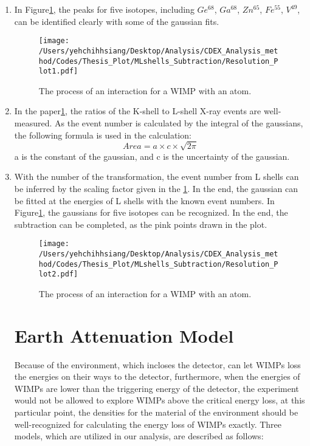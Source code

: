 \begin{enumerate}
	\item In Figure\ref{}, the peaks for five isotopes, including $Ge^{68}$, $Ga^{68}$, $Zn^{65}$, $Fe^{55}$, $V^{49}$, can be identified clearly with some of the gaussian fits. \\
	
        \begin{figure}[h]
        \texttt{[image: /Users/yehchihhsiang/Desktop/Analysis/CDEX\_Analysis\_method/Codes/Thesis\_Plot/MLshells\_Subtraction/Resolution\_Plot1.pdf]}
        \centering
        \caption{The process of an interaction for a WIMP with an atom.} \label{Interaction}
        \end{figure}
        
	\item In the paper\ref{}, the ratios of the K-shell to L-shell X-ray events are well-measured.  As the event number is calculated by the integral of the gaussians, the following formula is used in the calculation:\\
	\begin{equation}
        \label{Gaussian Area}
        Area  = a \times c \times \sqrt{2 \pi} 
        \end{equation}
        a is the constant of the gaussian, and c is the uncertainty of the gaussian.
        	\item With the number of the transformation, the event number from L shells can be inferred by the scaling factor given in the \ref{}. In the end, the gaussian can be fitted at the energies of L shells with the known event numbers. In Figure\ref{}, the gaussians for five isotopes can be recognized. In the end, the subtraction can be completed, as the pink points drawn in the plot. \\
        \begin{figure}[h]
        \texttt{[image: /Users/yehchihhsiang/Desktop/Analysis/CDEX\_Analysis\_method/Codes/Thesis\_Plot/MLshells\_Subtraction/Resolution\_Plot2.pdf]}
        \centering
        \caption{The process of an interaction for a WIMP with an atom.} \label{Interaction}
        \end{figure}

\section{Earth Attenuation Model}
Because of the environment, which incloses the detector, can let WIMPs loss the energies on their ways to the detector, furthermore, when the energies of WIMPs are lower than the triggering energy of the detector, the experiment would not be allowed to explore WIMPs above the critical energy loss, at this particular point, the densities for the material of the environment should be well-recognized for calculating the energy loss of WIMPs exactly. Three models, which are utilized in our analysis, are described as follows:


\end{enumerate}
